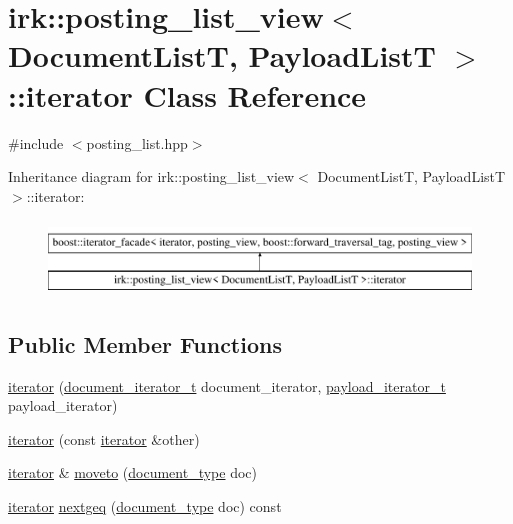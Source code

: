 \hypertarget{classirk_1_1posting__list__view_1_1iterator}{}\section{irk\+:\+:posting\+\_\+list\+\_\+view$<$ Document\+ListT, Payload\+ListT $>$\+:\+:iterator Class Reference}
\label{classirk_1_1posting__list__view_1_1iterator}


{\ttfamily \#include $<$posting\+\_\+list.\+hpp$>$}

Inheritance diagram for irk\+:\+:posting\+\_\+list\+\_\+view$<$ Document\+ListT, Payload\+ListT $>$\+:\+:iterator\+:\begin{figure}[H]
\begin{center}
\leavevmode
\includegraphics[height=2.000000cm]{classirk_1_1posting__list__view_1_1iterator}
\end{center}
\end{figure}
\subsection*{Public Member Functions}
\begin{DoxyCompactItemize}
\item 
\mbox{\hyperlink{classirk_1_1posting__list__view_1_1iterator_a0735df34097a1113f0295d27791f985d}{iterator}} (\mbox{\hyperlink{classirk_1_1posting__list__view_abaca622760e6da2c67d55cf35207250f}{document\+\_\+iterator\+\_\+t}} document\+\_\+iterator, \mbox{\hyperlink{classirk_1_1posting__list__view_a5a153169348a164ea2cb1a18dc76e279}{payload\+\_\+iterator\+\_\+t}} payload\+\_\+iterator)
\item 
\mbox{\hyperlink{classirk_1_1posting__list__view_1_1iterator_aa4053b60f98871ed18bf6bfb87dfdd18}{iterator}} (const \mbox{\hyperlink{classirk_1_1posting__list__view_1_1iterator}{iterator}} \&other)
\item 
\mbox{\hyperlink{classirk_1_1posting__list__view_1_1iterator}{iterator}} \& \mbox{\hyperlink{classirk_1_1posting__list__view_1_1iterator_a2f70673e696d84d36854a359b749cd49}{moveto}} (\mbox{\hyperlink{classirk_1_1posting__list__view_ac4615e6e3d8ee1eb9a847b7a34919977}{document\+\_\+type}} doc)
\item 
\mbox{\hyperlink{classirk_1_1posting__list__view_1_1iterator}{iterator}} \mbox{\hyperlink{classirk_1_1posting__list__view_1_1iterator_ac86c0cfbfa10ffc60fcde9a1af51bbc3}{nextgeq}} (\mbox{\hyperlink{classirk_1_1posting__list__view_ac4615e6e3d8ee1eb9a847b7a34919977}{document\+\_\+type}} doc) const
\end{DoxyCompactItemize}

